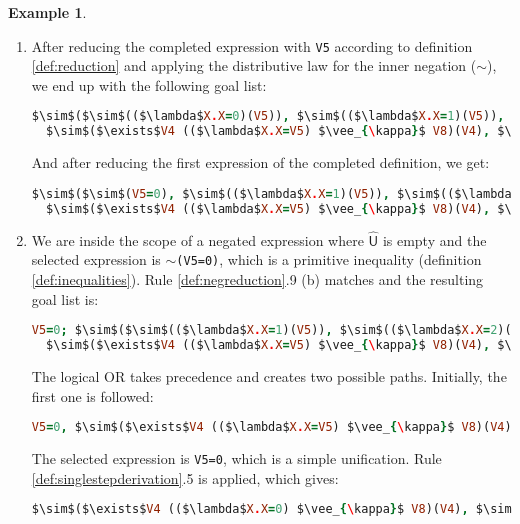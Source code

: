 \documentclass[inscr,ack,preface]{dithesis}
\theoremstyle{definition}
\newtheorem{example}{Example}[chapter]
\newcommand{\msf}[1]{$\mathsf{#1}$}
\begin{document}
\begin{example}
\begin{enumerate}
\item After reducing the completed expression with \texttt{V5} according to definition \ref{def:reduction} and applying the distributive law for the inner negation ($\sim$), we end up with the following goal list:
\begin{lstlisting}[language=Prolog,%
  frame=single,breaklines=false,mathescape=true]
  $\sim$($\sim$(($\lambda$X.X=0)(V5)), $\sim$(($\lambda$X.X=1)(V5)), $\sim$(($\lambda$X.X=2)(V5))),
  $\sim$($\exists$V4 (($\lambda$X.X=V5) $\vee_{\kappa}$ V8)(V4), $\sim$q(V4)) ?
\end{lstlisting}
And after reducing the first expression of the completed definition, we get:
\begin{lstlisting}[language=Prolog,%
  frame=single,breaklines=false,mathescape=true]
  $\sim$($\sim$(V5=0), $\sim$(($\lambda$X.X=1)(V5)), $\sim$(($\lambda$X.X=2)(V5))),
  $\sim$($\exists$V4 (($\lambda$X.X=V5) $\vee_{\kappa}$ V8)(V4), $\sim$q(V4)) ?
\end{lstlisting}

\item We are inside the scope of a negated expression where \msf{\widehat{U}} is empty and the selected expression is \texttt{$\sim$(V5=0)}, which is a primitive inequality (definition \ref{def:inequalities}). Rule \ref{def:negreduction}.9 (b) matches and the resulting goal list is:
\begin{lstlisting}[language=Prolog,%
  frame=single,breaklines=false,mathescape=true]
  V5=0; $\sim$($\sim$(($\lambda$X.X=1)(V5)), $\sim$(($\lambda$X.X=2)(V5))),
  $\sim$($\exists$V4 (($\lambda$X.X=V5) $\vee_{\kappa}$ V8)(V4), $\sim$q(V4)) ?
\end{lstlisting}

The logical OR takes precedence and creates two possible paths. Initially, the first one is followed:
\begin{lstlisting}[language=Prolog,%
  frame=single,breaklines=false,mathescape=true]
  V5=0, $\sim$($\exists$V4 (($\lambda$X.X=V5) $\vee_{\kappa}$ V8)(V4), $\sim$q(V4)) ?
\end{lstlisting}

The selected expression is \texttt{V5=0}, which is a simple unification. Rule \ref{def:singlestepderivation}.5 is applied, which gives:
\begin{lstlisting}[language=Prolog,%
  frame=single,breaklines=false,mathescape=true]
  $\sim$($\exists$V4 (($\lambda$X.X=0) $\vee_{\kappa}$ V8)(V4), $\sim$q(V4)) ?
\end{lstlisting}


\end{enumerate}
\end{example}
\end{document}
